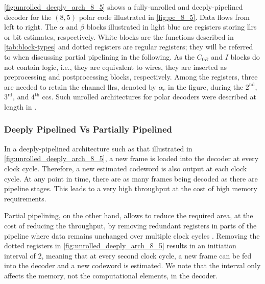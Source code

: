 \documentclass[conference,letterpaper]{IEEEtran}
\begin{document}
\autoref{fig:unrolled_deeply_arch_8_5} shows a fully-unrolled and deeply-pipelined decoder for the $(8,5)$ polar code illustrated in \autoref{fig:pc_8_5}. Data flows from left to right. The $\alpha$ and $\beta$ blocks illustrated in light blue are registers storing \glspl{llr} or bit estimates, respectively. White blocks are the functions described in \autoref{tab:block-types} and dotted registers are regular registers; they will be referred to when discussing partial pipelining in the following. As the $C_{0R}$ and $I$ blocks do not contain logic, i.e., they are equivalent to wires, they are inserted as preprocessing and postprocessing blocks, respectively. Among the registers, three are needed to retain the channel \glspl{llr}, denoted by $\alpha_c$ in the figure, during the $2^\text{nd}$, $3^\text{rd}$, and $4^{\text{th}}$ \glspl{cc}. Such unrolled architectures for polar decoders were described at length in \cite{Giard_TCASI_2016}.

\subsubsection*{Deeply Pipelined Vs Partially Pipelined}
In a deeply-pipelined architecture such as that illustrated in \autoref{fig:unrolled_deeply_arch_8_5}, a new frame is loaded into the decoder at every clock cycle. Therefore, a new estimated codeword is also output at each clock cycle. At any point in time, there are as many frames being decoded as there are pipeline stages. This leads to a very high throughput at the cost of high memory requirements.

Partial pipelining, on the other hand, allows to reduce the required area, at the cost of reducing the throughput, by removing redundant registers in parts of the pipeline where data remains unchanged over multiple clock cycles \cite{Giard_TCASI_2016}. Removing the dotted registers in \autoref{fig:unrolled_deeply_arch_8_5} results in an initiation interval of 2, meaning that at every second clock cycle, a new frame can be fed into the decoder and a new codeword is estimated. We note that the interval only affects the memory, not the computational elements, in the decoder.
\end{document}
